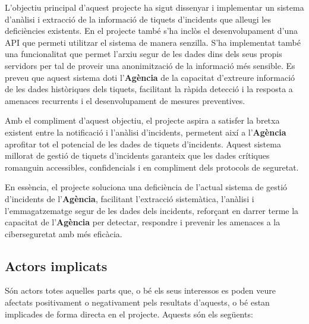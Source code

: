 L'objectiu principal d'aquest projecte ha sigut dissenyar i implementar un sistema d'anàlisi i extracció de la informació de tiquets d'incidents que alleugi les deficiències existents. En el projecte també s'ha inclòs el desenvolupament d'una API que permeti utilitzar el sistema de manera senzilla. S'ha implementat també una funcionalitat que permet l'arxiu segur de les dades dins dels seus propis servidors per tal de proveir una anonimització de la informació més sensible. Es preveu que aquest sistema doti l'\textbf{Agència} de la capacitat d'extreure informació de les dades històriques dels tiquets, facilitant la ràpida detecció i la resposta a amenaces recurrents i el desenvolupament de mesures preventives.

Amb el compliment d'aquest objectiu, el projecte aspira a satisfer la bretxa existent entre la notificació i l'anàlisi d'incidents, permetent així a l'\textbf{Agència} aprofitar tot el potencial de les dades de tiquets d'incidents. Aquest sistema millorat de gestió de tiquets d'incidents garanteix que les dades crítiques romanguin accessibles, confidencials i en compliment dels protocols de seguretat. 

En essència, el projecte soluciona una deficiència de l'actual sistema de gestió d'incidents de l'\textbf{Agència}, facilitant l'extracció sistemàtica, l'anàlisi i l'emmagatzematge segur de les dades dels incidents, reforçant en darrer terme la capacitat de l'\textbf{Agència} per detectar, respondre i prevenir les amenaces a la ciberseguretat amb més eficàcia.


\subsection{Actors implicats}
Són actors totes aquelles parts que, o bé els seus interessos es poden veure afectats positivament o negativament pels resultats d'aquests, o bé estan implicades de forma directa en el projecte. Aquests són els següents:

